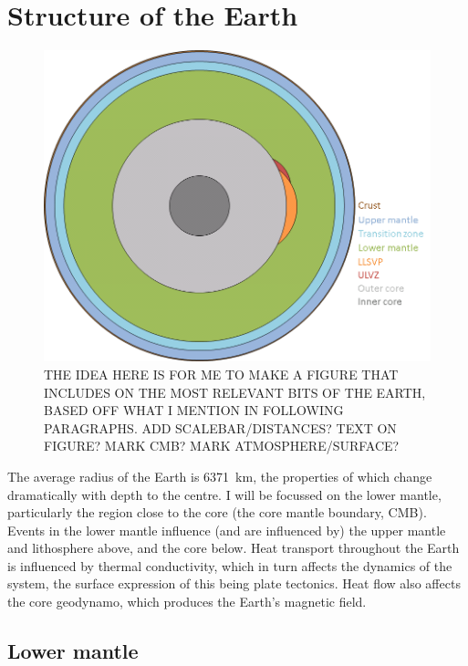 \section{Structure of the Earth}
\label{sec:earth_structure}

\begin{figure}[h!]
  \includegraphics[width=\linewidth]{Figures/pp_earth_diagram.png}
  \caption[EARTH STRUCTURE DIAGRAM]{THE IDEA HERE IS FOR ME TO MAKE A FIGURE THAT INCLUDES ON THE MOST RELEVANT BITS OF THE EARTH, BASED OFF WHAT I MENTION IN FOLLOWING PARAGRAPHS. ADD SCALEBAR/DISTANCES? TEXT ON FIGURE? MARK CMB? MARK ATMOSPHERE/SURFACE?}
  \label{fig:earth_diagram}
\end{figure}

The average radius of the Earth is 6371~km, the properties of which change dramatically with depth to the centre. I will be focussed on the lower mantle, particularly the region close to the core (the core mantle boundary, CMB). Events in the lower mantle influence (and are influenced by) the upper mantle and lithosphere above, and the core below. Heat transport throughout the Earth is influenced by thermal conductivity, which in turn affects the dynamics of the system, the surface expression of this being plate tectonics. Heat flow also affects the core geodynamo, which produces the Earth's magnetic field. 

\subsection{Lower mantle}

